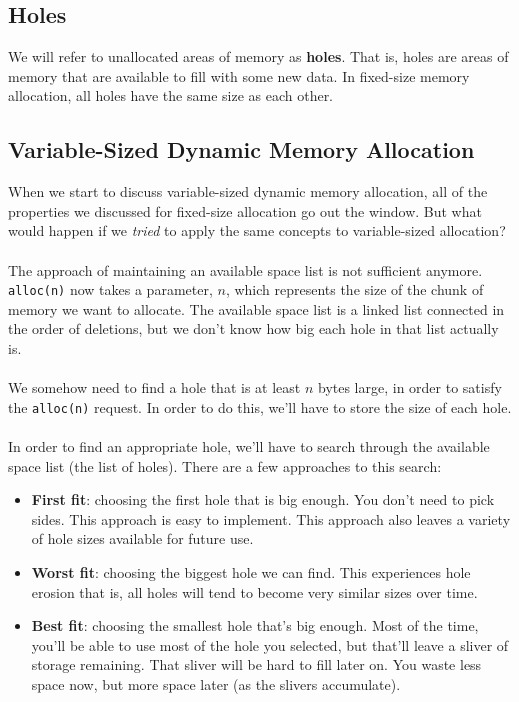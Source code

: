 \documentclass[]{article}
\theoremstyle{definition}
\newcommand{\lecture}[1]{\marginpar{{\footnotesize $\leftarrow$ \underline{#1}}}}
\begin{document}
		\subsection{Holes} \lecture{April 3, 2013}
			We will refer to unallocated areas of memory as \textbf{holes}. That is, holes are areas of memory that are available to fill with some new data. In fixed-size memory allocation, all holes have the same size as each other.
		
		\subsection{Variable-Sized Dynamic Memory Allocation}
			When we start to discuss variable-sized dynamic memory allocation, all of the properties we discussed for fixed-size allocation go out the window. But what would happen if we \emph{tried} to apply the same concepts to variable-sized allocation?
			\\ \\
			The approach of maintaining an available space list is not sufficient anymore. \verb+alloc(n)+ now takes a parameter, $n$, which represents the size of the chunk of memory we want to allocate. The available space list is a linked list connected in the order of deletions, but we don't know how big each hole in that list actually is.
			\\ \\
			We somehow need to find a hole that is at least $n$ bytes large, in order to satisfy the \verb+alloc(n)+ request. In order to do this, we'll have to store the size of each hole.
			\\ \\
			In order to find an appropriate hole, we'll have to search through the available space list (the list of holes). There are a few approaches to this search:
			\begin{itemize}
				\item \textbf{First fit}: choosing the first hole that is big enough. You don't need to pick sides. This approach is easy to implement. This approach also leaves a variety of hole sizes available for future use.
				\item \textbf{Worst fit}: choosing the biggest hole we can find. This experiences hole erosion \textendash{} that is, all holes will tend to become very similar sizes over time.
				\item \textbf{Best fit}: choosing the smallest hole that's big enough. Most of the time, you'll be able to use most of the hole you selected, but that'll leave a sliver of storage remaining. That sliver will be hard to fill later on. You waste less space now, but more space later (as the slivers accumulate).
			\end{itemize}
			
\end{document}
